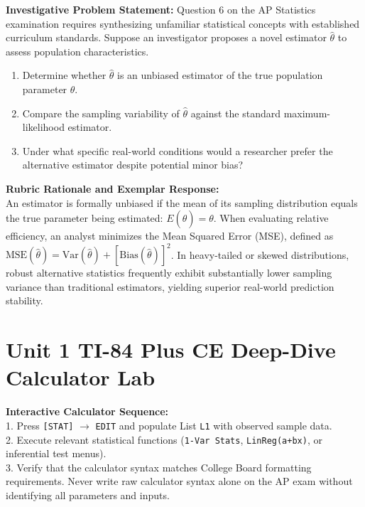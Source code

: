 \begin{frqrubricbox}
\textbf{Investigative Problem Statement:} Question 6 on the AP Statistics examination requires synthesizing unfamiliar statistical concepts with established curriculum standards. Suppose an investigator proposes a novel estimator $\hat{\theta}$ to assess population characteristics.
\begin{enumerate}[label=(\alph*)]
  \item Determine whether $\hat{\theta}$ is an unbiased estimator of the true population parameter $\theta$.
  \item Compare the sampling variability of $\hat{\theta}$ against the standard maximum-likelihood estimator.
  \item Under what specific real-world conditions would a researcher prefer the alternative estimator despite potential minor bias?
\end{enumerate}
\textbf{Rubric Rationale and Exemplar Response:}\\
An estimator is formally unbiased if the mean of its sampling distribution equals the true parameter being estimated: $E(\hat{\theta}) = \theta$. When evaluating relative efficiency, an analyst minimizes the Mean Squared Error (MSE), defined as $\text{MSE}(\hat{\theta}) = \text{Var}(\hat{\theta}) + [\text{Bias}(\hat{\theta})]^2$. In heavy-tailed or skewed distributions, robust alternative statistics frequently exhibit substantially lower sampling variance than traditional estimators, yielding superior real-world prediction stability.
\end{frqrubricbox}\vspace{6pt}
\section{Unit 1 TI-84 Plus CE Deep-Dive Calculator Lab}
\begin{calculatorbox}
\textbf{Interactive Calculator Sequence:}\\
1. Press \texttt{[STAT]} $\rightarrow$ \texttt{EDIT} and populate List \texttt{L1} with observed sample data.\\
2. Execute relevant statistical functions (\texttt{1-Var Stats}, \texttt{LinReg(a+bx)}, or inferential test menus).\\
3. Verify that the calculator syntax matches College Board formatting requirements. Never write raw calculator syntax alone on the AP exam without identifying all parameters and inputs.
\end{calculatorbox}\vspace{10pt}
